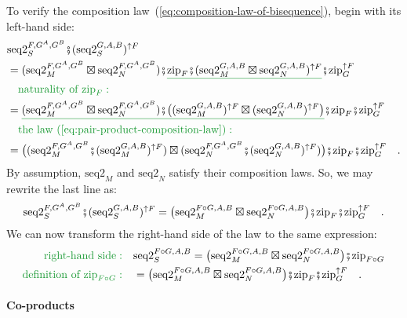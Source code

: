 To verify the composition law~(\ref{eq:composition-law-of-bisequence}),
begin with its left-hand side:
\begin{align*}
 & \text{seq2}_{S}^{F,G^{A},G^{B}}\bef(\text{seq2}_{S}^{G,A,B})^{\uparrow F}\\
 & =(\text{seq2}_{M}^{F,G^{A},G^{B}}\boxtimes\text{seq2}_{N}^{F,G^{A},G^{B}})\bef\gunderline{\text{zip}_{F}\bef(\text{seq2}_{M}^{G,A,B}\boxtimes\text{seq2}_{N}^{G,A,B})^{\uparrow F}}\bef\text{zip}_{G}^{\uparrow F}\\
 & \quad{\color{greenunder}\text{naturality of }\text{zip}_{F}:}\quad\\
 & =\gunderline{(\text{seq2}_{M}^{F,G^{A},G^{B}}\boxtimes\text{seq2}_{N}^{F,G^{A},G^{B}})\bef\big((\text{seq2}_{M}^{G,A,B})^{\uparrow F}\boxtimes(\text{seq2}_{N}^{G,A,B})^{\uparrow F}\big)}\bef\text{zip}_{F}\bef\text{zip}_{G}^{\uparrow F}\\
 & \quad{\color{greenunder}\text{the law~(\ref{eq:pair-product-composition-law})}:}\quad\\
 & =\big((\text{seq2}_{M}^{F,G^{A},G^{B}}\bef(\text{seq2}_{M}^{G,A,B})^{\uparrow F})\boxtimes(\text{seq2}_{N}^{F,G^{A},G^{B}}\bef(\text{seq2}_{N}^{G,A,B})^{\uparrow F})\big)\bef\text{zip}_{F}\bef\text{zip}_{G}^{\uparrow F}\quad.
\end{align*}
By assumption, $\text{seq2}_{M}$ and $\text{seq2}_{N}$ satisfy their
composition laws. So, we may rewrite the last line as:
\[
\text{seq2}_{S}^{F,G^{A},G^{B}}\bef(\text{seq2}_{S}^{G,A,B})^{\uparrow F}=\big(\text{seq2}_{M}^{F\circ G,A,B}\boxtimes\text{seq2}_{N}^{F\circ G,A,B}\big)\bef\text{zip}_{F}\bef\text{zip}_{G}^{\uparrow F}\quad.
\]
We can now transform the right-hand side of the law to the same expression:
\begin{align*}
{\color{greenunder}\text{right-hand side}:}\quad & \text{seq2}_{S}^{F\circ G,A,B}=\big(\text{seq2}_{M}^{F\circ G,A,B}\boxtimes\text{seq2}_{N}^{F\circ G,A,B}\big)\bef\text{zip}_{F\circ G}\\
{\color{greenunder}\text{definition of }\text{zip}_{F\circ G}:}\quad & =\big(\text{seq2}_{M}^{F\circ G,A,B}\boxtimes\text{seq2}_{N}^{F\circ G,A,B}\big)\bef\text{zip}_{F}\bef\text{zip}_{G}^{\uparrow F}\quad.
\end{align*}


\paragraph{Co-products}

